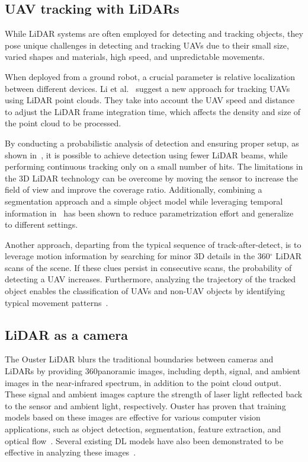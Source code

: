 \subsection{UAV tracking with LiDARs}

While LiDAR systems are often employed for detecting and tracking objects, they pose unique challenges in detecting and tracking UAVs due to their small size, varied shapes and materials, high speed, and unpredictable movements.

When deployed from a ground robot, a crucial parameter is relative localization between different devices. Li et al.~\cite{qingqing2021adaptive} suggest a new approach for tracking UAVs using LiDAR point clouds. They take into account the UAV speed and distance to adjust the LiDAR frame integration time, which affects the density and size of the point cloud to be processed.

By conducting a probabilistic analysis of detection and ensuring proper setup, as shown in~\cite{dogru2022dronedetection}, it is possible to achieve detection using fewer LiDAR beams, while performing continuous tracking only on a small number of hits. The limitations in the 3D LiDAR technology can be overcome by moving the sensor to increase the field of view and improve the coverage ratio. Additionally, combining a segmentation approach and a simple object model while leveraging temporal information in~\cite{razlaw2019DetectionAT} has been shown to reduce parametrization effort and generalize to different settings.

Another approach, departing from the typical sequence of track-after-detect, is to leverage motion information by searching for minor 3D details in the 360$^{\circ}$ LiDAR scans of the scene. If these clues persist in consecutive scans, the probability of detecting a UAV increases. Furthermore, analyzing the trajectory of the tracked object enables the classification of UAVs and non-UAV objects by identifying typical movement patterns~\cite{hammer2018potentiallidardetection, hammer2018lidarsmalluavs}.

\subsection{LiDAR as a camera}

The Ouster LiDAR blurs the traditional boundaries between cameras and LiDARs by providing 360\textdegree panoramic images, including depth, signal, and ambient images in the near-infrared spectrum, in addition to the point cloud output. These signal and ambient images capture the strength of laser light reflected back to the sensor and ambient light, respectively. Ouster has proven that training models based on these images are effective for various computer vision applications, such as object detection, segmentation, feature extraction, and optical flow~\cite{tampuu2022lidar,angus2018lidar}. Several existing DL models have also been demonstrated to be effective in analyzing these images~\cite{xianjia2022analyzing}. 

